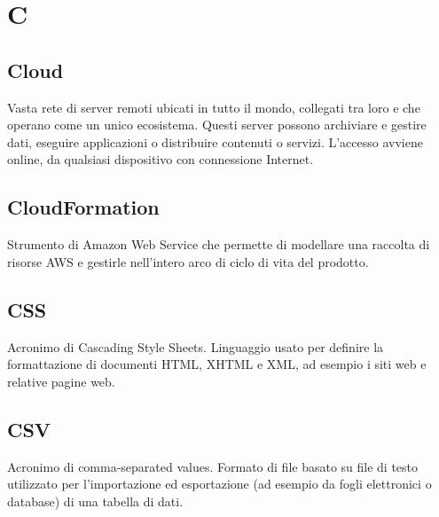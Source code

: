 \section*{C}
\markright{}
\subsection*{Cloud}
Vasta rete di server remoti ubicati in tutto il mondo, collegati tra loro e che operano come un unico ecosistema. Questi server possono archiviare e gestire dati, eseguire applicazioni o distribuire contenuti o servizi. L'accesso avviene online, da qualsiasi dispositivo con connessione Internet.
\subsection*{CloudFormation}
Strumento di Amazon Web Service che permette di modellare una raccolta di risorse AWS e gestirle nell'intero arco di ciclo di vita del prodotto.
\subsection*{CSS}
Acronimo di Cascading Style Sheets. Linguaggio usato per definire la formattazione di documenti HTML, XHTML e XML, ad esempio i siti web e relative pagine web.
\subsection*{CSV}
Acronimo di comma-separated values. Formato di file basato su file di testo utilizzato per l'importazione ed esportazione (ad esempio da fogli elettronici o database) di una tabella di dati. 